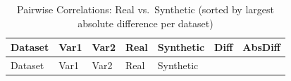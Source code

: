 \documentclass[
  letterpaper,
  DIV=11,
  numbers=noendperiod]{scrartcl}
\begin{document}
\begin{longtable}[]{@{}
  >{\raggedright\arraybackslash}p{}
  >{\raggedright\arraybackslash}p{}
  >{\raggedright\arraybackslash}p{}
  >{\raggedleft\arraybackslash}p{}
  >{\raggedleft\arraybackslash}p{}
  >{\raggedleft\arraybackslash}p{}
  >{\raggedleft\arraybackslash}p{}@{}}
\caption{Pairwise Correlations: Real vs.~Synthetic (sorted by largest
absolute difference per dataset)}\tabularnewline
\toprule\noalign{}
\begin{minipage}[b]{\linewidth}\raggedright
Dataset
\end{minipage} & \begin{minipage}[b]{\linewidth}\raggedright
Var1
\end{minipage} & \begin{minipage}[b]{\linewidth}\raggedright
Var2
\end{minipage} & \begin{minipage}[b]{\linewidth}\raggedleft
Real
\end{minipage} & \begin{minipage}[b]{\linewidth}\raggedleft
Synthetic
\end{minipage} & \begin{minipage}[b]{\linewidth}\raggedleft
Diff
\end{minipage} & \begin{minipage}[b]{\linewidth}\raggedleft
AbsDiff
\end{minipage} \\
\midrule\noalign{}
\endfirsthead
\toprule\noalign{}
\begin{minipage}[b]{\linewidth}\raggedright
Dataset
\end{minipage} & \begin{minipage}[b]{\linewidth}\raggedright
Var1
\end{minipage} & \begin{minipage}[b]{\linewidth}\raggedright
Var2
\end{minipage} & \begin{minipage}[b]{\linewidth}\raggedleft
Real
\end{minipage} & \begin{minipage}[b]{\linewidth}\raggedleft
Synthetic
\end{minipage} & \begin{minipage}[b]{\linewidth}\raggedleft

\end{minipage}
\end{longtable}
\end{document}
